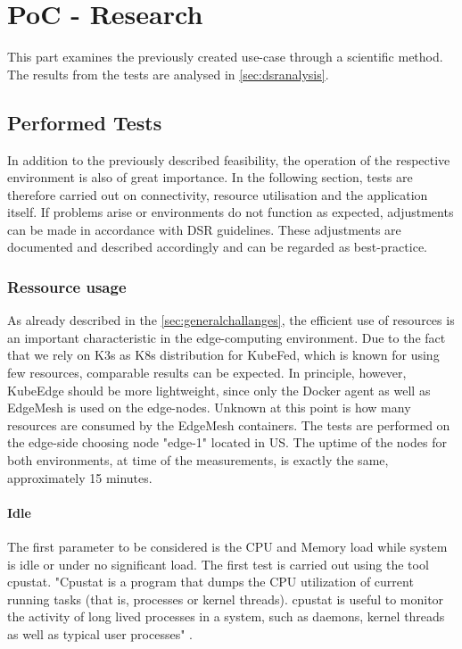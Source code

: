 \documentclass[MIC,Master,english]{twbook}%
\begin{document}
\pagebreak
\chapter{PoC - Research}
\label{chap:poc-research}
This part examines the previously created use-case through a scientific method. The results from the tests are analysed in \autoref{sec:dsranalysis}.

\section{Performed Tests}
\label{sec:dsrtest}
In addition to the previously described feasibility, the operation of the respective environment is also of great importance. In the following section, tests are therefore carried out on connectivity, resource utilisation and the application itself. If problems arise or environments do not function as expected, adjustments can be made in accordance with \ac{DSR} guidelines. These adjustments are documented and described accordingly and can be regarded as best-practice.
\subsection{Ressource usage}
\label{sec:dsrtestress}
As already described in the \autoref{sec:generalchallanges}, the efficient use of resources is an important characteristic in the edge-computing environment. Due to the fact that we rely on K3s as \ac{K8s} distribution for KubeFed, which is known for using few resources, comparable results can be expected. In principle, however, KubeEdge should be more lightweight, since only the Docker agent as well as EdgeMesh is used on the edge-nodes. Unknown at this point is how many resources are consumed by the EdgeMesh containers. The tests are performed on the edge-side choosing node "edge-1" located in US. The uptime of the nodes for both environments, at time of the measurements, is exactly the same, approximately 15 minutes.

\subsubsection{Idle}
The first parameter to be considered is the CPU and Memory load while system is idle or under no significant load. The first test is carried out using the tool cpustat. "Cpustat is a program that dumps the CPU utilization of current running tasks (that is, processes or kernel threads). cpustat is useful to monitor the activity of long lived processes in a system, such as daemons, kernel threads as well as typical user processes" \cite{cpustat}. \medbreak
\end{document}
